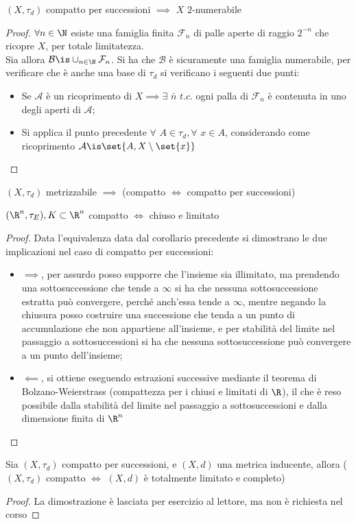 \begin{prop}
$(X, \tau _d)$ compatto per successioni $\implies$ $X$ $2$-numerabile
\end{prop}
\begin{proof}
$\forall n \in \N$ esiste una famiglia finita $\mathcal{F}_n$ di palle aperte di raggio $2^{-n}$ che ricopre $X$, per totale limitatezza.\\
Sia allora $\mathcal{B} \is \cup _{n \in \N} \mathcal{F}_n$. Si ha che $\mathcal{B}$ è sicuramente una famiglia numerabile, per verificare che è anche una base di $\tau _d$ si verificano i seguenti due punti:
\begin{itemize}
\item Se $\mathcal{A}$ è un ricoprimento di $X \implies \exists$ $\bar{n}$ $t.c.$ ogni palla di $\mathcal{F}_n$ è contenuta in uno degli aperti di $\mathcal{A}$;
\item Si applica il punto precedente $\forall$ $A \in \tau _d , \forall$ $x \in A$, considerando come ricoprimento $\mathcal{A} \is \set{A, X\setminus \set{x}}$
\end{itemize}
\end{proof}

\begin{cor}
$(X,\tau _d)$ metrizzabile $\implies$ (compatto $\iff$ compatto per successioni)
\end{cor}

\begin{prop}
$(\R^n, \tau _E), K\subset \R^n$ compatto $\iff$ chiuso e limitato
\end{prop}
\begin{proof}
Data l'equivalenza data dal corollario precedente si dimostrano le due implicazioni nel caso di compatto per successioni:
\begin{itemize}
\item $\implies$, per assurdo posso supporre che l'insieme sia illimitato, ma prendendo una sottosuccessione che tende a $\infty$ si ha che nessuna sottosuccessione estratta può convergere, perché anch'essa tende a $\infty$, mentre negando la chiusura posso costruire una successione che tenda a un punto di accumulazione che non appartiene all'insieme, e per stabilità del limite nel passaggio a sottosuccessioni si ha che nessuna sottosuccessione può convergere a un punto dell'insieme;
\item $\impliedby$, si ottiene eseguendo estrazioni successive mediante il teorema di Bolzano-Weierstrass (compattezza per i chiusi e limitati di $\R$), il che è reso possibile dalla stabilità del limite nel passaggio a sottosuccessioni e dalla dimensione finita di $\R^n$
\end{itemize}
\end{proof}

\begin{teo}
Sia $(X,\tau _d)$ compatto per successioni, e $(X,d)$ una metrica inducente, allora ($(X,\tau _d)$ compatto $\iff$ $(X,d)$ è totalmente limitato e completo)
\end{teo}
\begin{proof}
La dimostrazione è lasciata per esercizio al lettore, ma non è richiesta nel corso
\end{proof}
